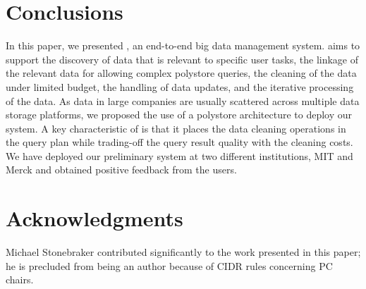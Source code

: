 \section{Conclusions}
\label{sec:conclusion}

In this paper, we presented \dcv,  an end-to-end big data management system. 
\dcv aims to support  the discovery of data that is relevant to specific user tasks, 
the linkage of the relevant data for allowing complex polystore queries, 
the cleaning of the data under limited budget, 
the handling of  data updates, 
and the iterative processing of the data. 
As data in large companies are usually scattered across multiple
data storage platforms, we proposed the use of a polystore architecture to deploy our system.
A key characteristic of \dcv is that it places the data cleaning operations in the query plan
while  trading-off the query result quality with the cleaning costs. 
We have deployed our preliminary system at two different institutions, MIT and Merck and obtained positive
feedback from the users.

\section{Acknowledgments}

 Michael Stonebraker contributed significantly to the work presented in this paper;
 he is precluded from being an author because of CIDR rules concerning PC chairs.


